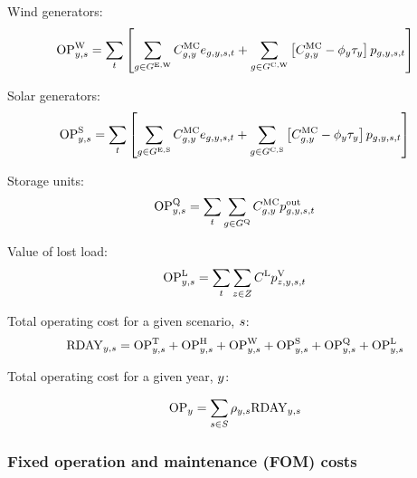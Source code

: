 \documentclass{article}
\begin{document}
Wind generators:
\begin{equation}
	\cOperatingCostWind = \sum\limits_{\iInterval}\left[\sum\limits_{\iGenerator \in \sGeneratorsExistingWind} \cMarginalCost \vEnergy + \sum\limits_{\iGenerator \in \sGeneratorsCandidateWind} \left[\cMarginalCost - \vBaseline \vPermitPrice\right] \vPower\right]
\end{equation}

Solar generators:
\begin{equation}
	\cOperatingCostSolar = \sum\limits_{\iInterval}\left[\sum\limits_{\iGenerator \in \sGeneratorsExistingSolar} \cMarginalCost \vEnergy + \sum\limits_{\iGenerator \in \sGeneratorsCandidateSolar} \left[\cMarginalCost - \vBaseline\vPermitPrice\right] \vPower\right]
\end{equation}

Storage units:
\begin{equation}
	\cOperatingCostStorage = \sum\limits_{\iInterval}\sum\limits_{\iGenerator \in \sStorage} \cMarginalCost \vPowerOut
\end{equation}

Value of lost load:
\begin{equation}
	\cOperatingCostLostLoad = \sum\limits_{\iInterval}\sum\limits_{\iZone \in \sZones} \cLostLoadCost \vLostLoadPower
\end{equation}

Total operating cost for a given scenario, $\iScenario$:
\begin{equation}
	\cOperatingCostScenario = \cOperatingCostThermal + \cOperatingCostHydro + \cOperatingCostWind + \cOperatingCostSolar + \cOperatingCostStorage + \cOperatingCostLostLoad
\end{equation}

Total operating cost for a given year, $\iYear$:

\begin{equation}
	\cOperatingCost[\iYear] = \sum\limits_{\iScenario \in \sScenarios} \cScenarioDuration \cOperatingCostScenario
\end{equation}

\subsubsection{Fixed operation and maintenance (FOM) costs}

\end{document}
